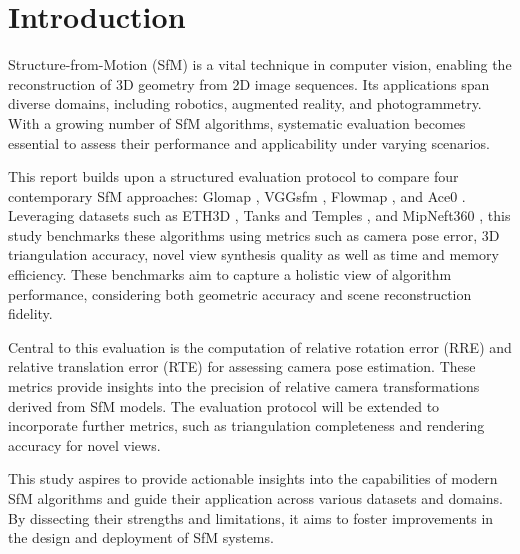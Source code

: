 \section{Introduction}\label{sec:introduction}

Structure-from-Motion (SfM) is a vital technique in computer vision, enabling the reconstruction of 3D geometry from 2D image sequences. 
Its applications span diverse domains, including robotics, augmented reality, and photogrammetry. 
With a growing number of SfM algorithms, systematic evaluation becomes essential to assess their performance and applicability under varying scenarios.

This report builds upon a structured evaluation protocol to compare four contemporary SfM approaches: Glomap \cite{pan2024glomap}, VGGsfm \cite{wang2023vggsfm}, Flowmap \cite{smith24flowmap}, and Ace0 \cite{brachmann2024acezero}. 
Leveraging datasets such as ETH3D \cite{Schops_2019_CVPR}, Tanks and Temples \cite{Knapitsch2017}, and MipNeft360 \cite{barron2022mipnerf360}, 
this study benchmarks these algorithms using metrics such as camera pose error, 3D triangulation accuracy, novel view synthesis quality \cite{DBLP:journals/corr/WaechterBFMKG16} as well as time and memory efficiency.
These benchmarks aim to capture a holistic view of algorithm performance, considering both geometric accuracy and scene reconstruction fidelity.

Central to this evaluation is the computation of relative rotation error (RRE) and relative translation error (RTE) for assessing camera pose estimation. 
These metrics provide insights into the precision of relative camera transformations derived from SfM models. 
The evaluation protocol will be extended to incorporate further metrics, such as triangulation completeness and rendering accuracy for novel views.

This study aspires to provide actionable insights into the capabilities of modern SfM algorithms and guide their application across various datasets and domains. 
By dissecting their strengths and limitations, it aims to foster improvements in the design and deployment of SfM systems.